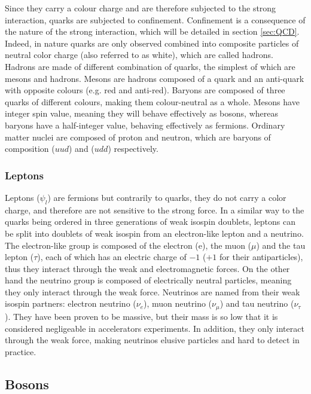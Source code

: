 Since they carry a colour charge and are therefore subjected to the strong interaction, quarks are subjected to confinement. Confinement is a consequence of the nature of the strong interaction, which will be detailed in section \ref{sec:QCD}. Indeed, in nature quarks are only observed combined into composite particles of neutral color charge (also referred to as white), which are called hadrons. Hadrons are made of different combination of quarks, the simplest of which are mesons and hadrons. Mesons are hadrons composed of a quark and an anti-quark with opposite colours (e.g. red and anti-red). Baryons are composed of three quarks of different colours, making them colour-neutral as a whole. Mesons have integer spin value, meaning they will behave effectively as bosons, whereas baryons have a half-integer value, behaving effectively as fermions. Ordinary matter nuclei are composed of proton and neutron, which are baryons of composition ($uud$) and ($udd$) respectively.

\subsubsection{Leptons}

Leptons ($\psi_l$) are fermions but contrarily to quarks, they do not carry a color charge, and therefore are not sensitive to the strong force. In a similar way to the quarks being ordered in three generations of weak isospin doublets, leptons can be split into doublets of weak isospin from an electron-like lepton and a neutrino. The electron-like group is composed of the electron (e), the muon ($\mu$) and the tau lepton ($\tau$), each of which has an electric charge of $-1$ ($+1$ for their antiparticles), thus they interact through the weak and electromagnetic forces. On the other hand the neutrino group is composed of electrically neutral particles, meaning they only interact through the weak force. Neutrinos are named from their weak isospin partners: electron neutrino ($\nu_e$), muon neutrino ($\nu_{\mu}$) and tau neutrino ($\nu_{\tau}$). They have been proven to be massive, but their mass is so low that it is considered negligeable in accelerators experiments. In addition, they only interact through the weak force, making neutrinos elusive particles and hard to detect in practice.

\subsection{Bosons}

